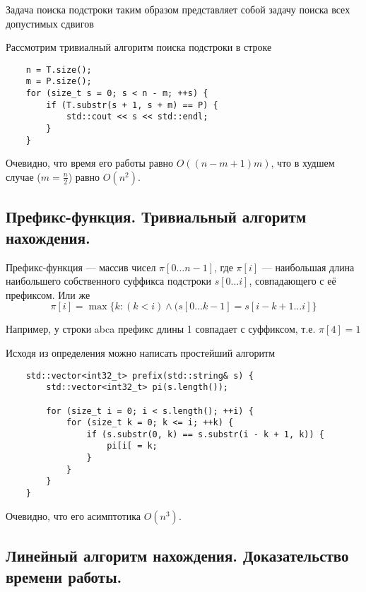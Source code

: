 \begin{remark}
	Задача поиска подстроки таким образом представляет собой задачу поиска всех допустимых сдвигов
\end{remark}

Рассмотрим тривиалный алгоритм поиска подстроки в строке

\begin{lstlisting}
	n = T.size();
	m = P.size();
	for (size_t s = 0; s < n - m; ++s) {
		if (T.substr(s + 1, s + m) == P) {
			std::cout << s << std::endl;
		}
	}
\end{lstlisting}

\begin{remark}
	Очевидно, что время его работы равно $O((n - m + 1)m)$, что в худшем случае ($m = \frac{n}{2}$) равно
	$O(n^2)$.
\end{remark}

\subsection{Префикс-функция. Тривиальный алгоритм нахождения.}

\begin{definition}
	Префикс-функция --- массив чисел $\pi [0 \ldots n-1]$, где $\pi [i]$ --- наибольшая длина наибольшего
	собственного суффикса подстроки $s[0 \ldots i]$, совпадающего с её префиксом. Или же
	 \[
		 \pi[i] = \max \{ k \colon (k < i) \wedge (s[0 \ldots k-1] = s[i - k + 1 \ldots i] \}
	\] 
\end{definition}

Например, у строки abca префикс длины 1 совпадает с суффиксом, т.е. $\pi [4] = 1$

Исходя из определения можно написать простейший алгоритм

\begin{lstlisting}
	std::vector<int32_t> prefix(std::string& s) {
		std::vector<int32_t> pi(s.length());

		for (size_t i = 0; i < s.length(); ++i) {
			for (size_t k = 0; k <= i; ++k) {
				if (s.substr(0, k) == s.substr(i - k + 1, k)) {
					pi[i[ = k;
				}
			}
		}
	}
\end{lstlisting}

\begin{remark}
	Очевидно, что его асимптотика $O(n^3)$.
\end{remark}

\subsection{Линейный алгоритм нахождения. Доказательство времени работы.}

